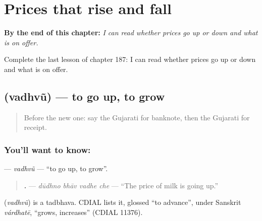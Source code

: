 
\chapter{Prices that rise and fall}
\label{ch:gu-prices-that-rise-and-fall}

\begin{chapteropening}
\textbf{By the end of this chapter:} \emph{I can read whether prices go up or down and what is on offer.}

Complete the last lesson of chapter 187: I can read whether prices go up or down and what is on offer.
\end{chapteropening}

\section[\texorpdfstring{\gu{વધવું} (vadhvũ)}{વધવું (vadhvũ)}]{ (vadhvũ) — to go up, to grow}

\label{lesson:GU-C187-vadhvu}



\begin{quote}
Before the new one: say the Gujarati for banknote, then the Gujarati for receipt.
\end{quote}

\subsection*{You'll want to know: }
\textbf{} — \emph{vadhvũ} — \textquotedblleft{}to go up, to grow\textquotedblright{}.

\begin{quote}
\textbf{   .} — \emph{dūdhno bhāv vadhe che} — \textquotedblleft{}The price of milk is going up.\textquotedblright{}
\end{quote}

\begin{cousinweb}
\textbf{} (\emph{vadhvũ}) is a tadbhava. CDIAL lists it, glossed \textquotedblleft{}to advance\textquotedblright{}, under Sanskrit \emph{várdhatē}, \textquotedblleft{}grows, increases\textquotedblright{} (CDIAL 11376).
\end{cousinweb}

